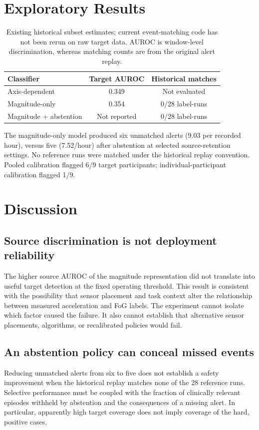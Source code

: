 \documentclass[sigconf,review,anonymous]{acmart}
\begin{document}
\section{Exploratory Results}
\begin{table}[t]
\caption{Existing historical subset estimates; current event-matching code has not been rerun on raw target data. AUROC is window-level discrimination, whereas matching counts are from the original alert replay.}
\label{tab:results}
\centering
\begin{tabular}{lcc}
\toprule
Classifier & Target AUROC & Historical matches\\
\midrule
Axis-dependent & 0.349 & Not evaluated\\
Magnitude-only & 0.354 & 0/28 label-runs\\
Magnitude + abstention & Not reported & 0/28 label-runs\\
\bottomrule
\end{tabular}
\end{table}

The magnitude-only model produced six unmatched alerts (9.03 per recorded hour), versus five (7.52/hour) after abstention at selected source-retention settings. No reference runs were matched under the historical replay convention. Pooled calibration flagged 6/9 target participants; individual-participant calibration flagged 1/9.
\section{Discussion}
\subsection{Source discrimination is not deployment reliability}
The higher source AUROC of the magnitude representation did not translate into useful target detection at the fixed operating threshold. This result is consistent with the possibility that sensor placement and task context alter the relationship between measured acceleration and FoG labels. The experiment cannot isolate which factor caused the failure. It also cannot establish that alternative sensor placements, algorithms, or recalibrated policies would fail.

\subsection{An abstention policy can conceal missed events}
Reducing unmatched alerts from six to five does not establish a safety improvement when the historical replay matches none of the 28 reference runs. Selective performance must be coupled with the fraction of clinically relevant episodes withheld by abstention and the consequences of a missing alert. In particular, apparently high target coverage does not imply coverage of the hard, positive cases.
\end{document}
